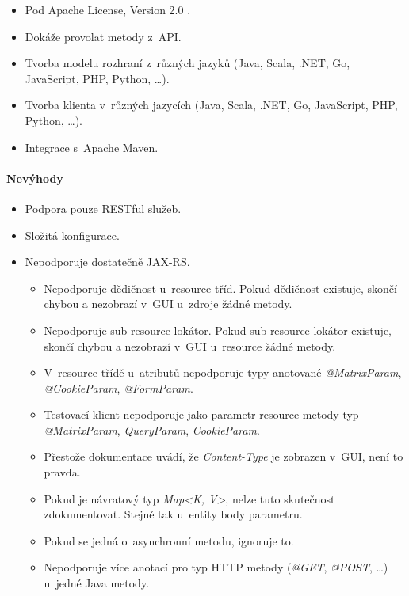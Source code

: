 \documentclass[11pt,twoside,a4paper]{book}
\begin{document}
\begin{itemize}
  \item Pod Apache License, Version 2.0 \cite{ApacheLic04}.
  \item Dokáže provolat metody z~API.
  \item Tvorba modelu rozhraní z~různých jazyků (Java, Scala, .NET, Go, JavaScript, PHP,
Python, \ldots).
  \item Tvorba klienta v~různých jazycích (Java, Scala, .NET, Go, JavaScript, PHP, Python,
\ldots).
\item Integrace s~Apache Maven.
\end{itemize}

\paragraph{Nevýhody}

\begin{itemize}
  \item Podpora pouze RESTful služeb.
  \item Složitá konfigurace.
  \item Nepodporuje dostatečně JAX-RS.
  \begin{itemize}
    \item Nepodporuje dědičnost u~resource tříd. Pokud dědičnost existuje, skončí chybou a
nezobrazí v~GUI u~zdroje žádné metody.
    \item Nepodporuje sub-resource lokátor. Pokud sub-resource lokátor existuje,
    skončí chybou a nezobrazí v~GUI u~resource žádné metody.
    \item V~resource třídě u~atributů nepodporuje typy anotované {\em
    @MatrixParam}, {\em @CookieParam}, {\em @FormParam}.
    \item Testovací klient nepodporuje jako parametr resource metody typ
{\em @MatrixParam}, {\em QueryParam}, {\em CookieParam}.
    \item Přestože dokumentace uvádí, že {\em Content-Type} je zobrazen v~GUI, není to
pravda.
    \item Pokud je návratový typ {\em Map<K, V>}, nelze tuto skutečnost
    zdokumentovat.
    Stejně tak u~entity body parametru.
    \item Pokud se jedná o~asynchronní metodu, ignoruje to.
    \item Nepodporuje více anotací pro typ HTTP metody ({\em @GET}, {\em @POST},
    \ldots) u~jedné Java metody.
\end{itemize}
\end{itemize}
\end{document}

